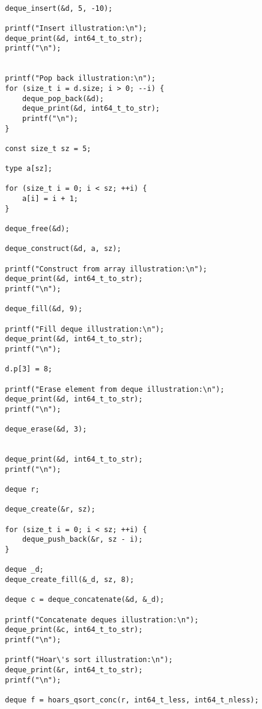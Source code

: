 \documentclass[a4paper]{article}
\newcounter{i}
\begin{document}
\begin{enumerate}[label=\textbf{\arabic*}.]
\begin{verbatim}
        
        deque_insert(&d, 5, -10);
    
        printf("Insert illustration:\n");
        deque_print(&d, int64_t_to_str);
        printf("\n");
    
    
        printf("Pop back illustration:\n");
        for (size_t i = d.size; i > 0; --i) {
            deque_pop_back(&d);
            deque_print(&d, int64_t_to_str);
            printf("\n");
        }
    
        const size_t sz = 5;
    
        type a[sz];
    
        for (size_t i = 0; i < sz; ++i) {
            a[i] = i + 1;
        }
    
        deque_free(&d);
    
        deque_construct(&d, a, sz);
    
        printf("Construct from array illustration:\n");
        deque_print(&d, int64_t_to_str);
        printf("\n");
    
        deque_fill(&d, 9);
    
        printf("Fill deque illustration:\n");
        deque_print(&d, int64_t_to_str);
        printf("\n");
    
        d.p[3] = 8;
    
        printf("Erase element from deque illustration:\n");
        deque_print(&d, int64_t_to_str);
        printf("\n");
    
        deque_erase(&d, 3);
    
    
        deque_print(&d, int64_t_to_str);
        printf("\n");
    
        deque r;
    
        deque_create(&r, sz);
    
        for (size_t i = 0; i < sz; ++i) {
            deque_push_back(&r, sz - i);
        }
    
        deque _d;
        deque_create_fill(&_d, sz, 8);
    
        deque c = deque_concatenate(&d, &_d);
    
        printf("Concatenate deques illustration:\n");
        deque_print(&c, int64_t_to_str);
        printf("\n");
    
        printf("Hoar\'s sort illustration:\n");
        deque_print(&r, int64_t_to_str);
        printf("\n");
    
        deque f = hoars_qsort_conc(r, int64_t_less, int64_t_nless);
    

\end{verbatim}
\end{enumerate}
\end{document}
